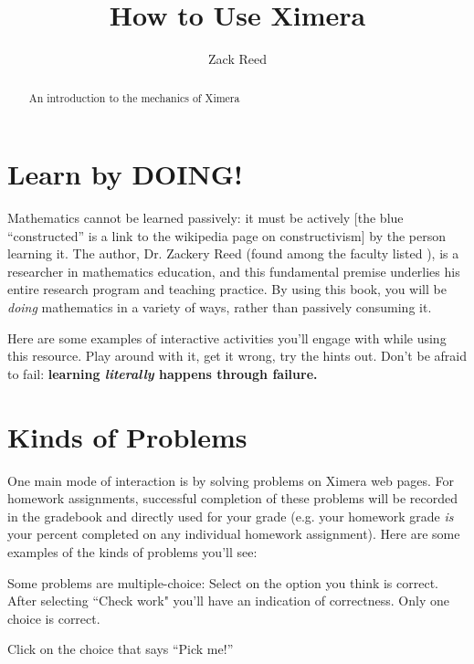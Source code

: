 \documentclass{ximera}
\author{Zack Reed}
\title{How to Use Ximera}
\begin{document}
\begin{abstract}
    An introduction to the mechanics of Ximera
\end{abstract}
\maketitle


\section*{Learn by DOING!}

Mathematics cannot be learned passively: it must be actively 
 [the blue ``constructed'' is a link to the wikipedia page on constructivism]
by the person learning it. The author, Dr. Zackery Reed (found among the faculty listed ), is a researcher in mathematics education, and this fundamental premise underlies his entire research program and teaching practice. By using this book, you will be \emph{doing} mathematics in a variety of ways, rather than passively consuming it.
 
Here are some examples of interactive activities you'll engage with while using this resource.  Play around with it, get it wrong, try the
hints out.  Don't be afraid to fail: \textbf{learning \emph{literally} happens through failure.}
 
\section*{Kinds of Problems}

One main mode of interaction is by solving problems on Ximera web pages. For homework assignments, successful completion of these problems will be recorded in the gradebook and directly used for your grade (e.g. your homework grade \emph{is} your percent completed on any individual homework assignment).  Here are some examples of the kinds of problems you'll see:
 
\begin{example}
  Some problems are multiple-choice: Select on the option you think is correct. After selecting ``Check work" you'll have an indication of correctness. Only one choice is correct.

  \begin{multipleChoice}
  \end{multipleChoice}
  \begin{feedback}
    Click on the choice that says ``Pick me!''
  \end{feedback}
\end{example}
 
\end{document}

